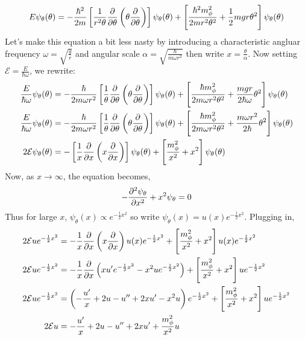 \documentclass[12pt]{extarticle}
\begin{document}
\begin{enumerate}
\[ E \psi_\theta(\theta) = -\frac{\hbar^2}{2m}  \left[ \frac{1}{r^2 \theta} \frac{\partial{}}{\partial{\theta}} \left( \theta \frac{\partial{}}{\partial{\theta}} \right) \right] \psi_\theta(\theta) + \left[ \frac{\hbar^2 m_\phi^2}{2m r^2 \theta^2} + \frac{1}{2}mgr \theta^2 \right] \psi_\theta(\theta) \]
Let's make this equation a bit less nasty by introducing a characteristic angluar frequency $\omega = \sqrt{\frac{g}{r}}$ and angular scale $\alpha = \sqrt{\frac{\hbar}{m \omega r^2}}$ then write $x = \frac{\theta}{\alpha}$. Now setting $\mathcal{E} = \frac{E}{\hbar \omega}$, we rewrite:
\begin{align*}
\frac{E}{\hbar \omega} \psi_\theta(\theta) &= -\frac{\hbar}{2m \omega r^2}  \left[ \frac{1}{\theta} \frac{\partial{}}{\partial{\theta}} \left( \theta \frac{\partial{}}{\partial{\theta}} \right) \right] \psi_\theta(\theta) + \left[ \frac{\hbar m_\phi^2}{2m \omega r^2 \theta^2} + \frac{mgr}{2 \hbar \omega} \theta^2 \right] \psi_\theta(\theta) \\
\frac{E}{\hbar \omega} \psi_\theta(\theta) &= -\frac{\hbar}{2m \omega r^2}  \left[ \frac{1}{\theta} \frac{\partial{}}{\partial{\theta}} \left( \theta \frac{\partial{}}{\partial{\theta}} \right) \right] \psi_\theta(\theta) + \left[ \frac{\hbar m_\phi^2}{2m \omega r^2 \theta^2} + \frac{m \omega r^2}{2 \hbar} \theta^2 \right] \psi_\theta(\theta) \\
2\mathcal{E} \psi_\theta(\theta) &= -\left[ \frac{1}{x} \frac{\partial{}}{\partial{x}} \left( x \frac{\partial{}}{\partial{x}} \right) \right] \psi_\theta(\theta) + \left[ \frac{m_\phi^2}{x^2} + x^2 \right] \psi_\theta(\theta)
\end{align*}
Now, as $x \rightarrow \infty$, the equation becomes,
\[-\frac{\partial^2{\psi_\theta}}{\partial{x}^2} + x^2 \psi_\theta = 0\]
Thus for large $x$, $\psi_\theta(x) \propto e^{-\frac{1}{2} x^2}$ so write $\psi_\theta(x) = u(x) e^{-\frac{1}{2}x^2}$. Plugging in,
\begin{align*}
2\mathcal{E} u e^{-\frac{1}{2}x^2} &= - \frac{1}{x} \pderiv{}{x} \left( x \pderiv{}{x} \right) u(x) e^{-\frac{1}{2}x^2} + \left[ \frac{m_\phi^2}{x^2} + x^2 \right]u(x) e^{-\frac{1}{2}x^2} \\
2\mathcal{E} u e^{-\frac{1}{2}x^2} &= -\frac{1}{x} \pderiv{}{x} \left(x u' e^{-\frac{1}{2}x^2} - x^2 u e^{-\frac{1}{2} x^2} \right) + \left[ \frac{m_\phi^2}{x^2} + x^2 \right]u e^{-\frac{1}{2}x^2} \\
2\mathcal{E} u e^{-\frac{1}{2}x^2} &= \left(-\frac{u'}{x} + 2u - u'' + 2x u' - x^2 u \right) e^{-\frac{1}{2} x^2} + \left[ \frac{m_\phi^2}{x^2} + x^2 \right]u e^{-\frac{1}{2}x^2} \\
2\mathcal{E} u &= -\frac{u'}{x} + 2u - u'' + 2x u' +  \frac{m_\phi^2}{x^2} u \\

\end{align*}
\end{enumerate}
\end{document}
